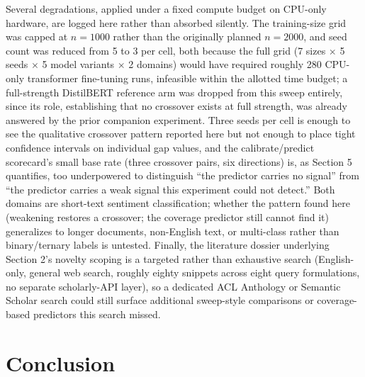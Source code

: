 \documentclass[11pt,letterpaper]{article}
\begin{document}
Several degradations, applied under a fixed compute budget on CPU-only hardware, are logged here rather than absorbed silently. The training-size grid was capped at $n{=}1000$ rather than the originally planned $n{=}2000$, and seed count was reduced from 5 to 3 per cell, both because the full grid (7 sizes $\times$ 5 seeds $\times$ 5 model variants $\times$ 2 domains) would have required roughly 280 CPU-only transformer fine-tuning runs, infeasible within the allotted time budget; a full-strength DistilBERT reference arm was dropped from this sweep entirely, since its role, establishing that no crossover exists at full strength, was already answered by the prior companion experiment. Three seeds per cell is enough to see the qualitative crossover pattern reported here but not enough to place tight confidence intervals on individual gap values, and the calibrate/predict scorecard's small base rate (three crossover pairs, six directions) is, as Section 5 quantifies, too underpowered to distinguish ``the predictor carries no signal'' from ``the predictor carries a weak signal this experiment could not detect.'' Both domains are short-text sentiment classification; whether the pattern found here (weakening restores a crossover; the coverage predictor still cannot find it) generalizes to longer documents, non-English text, or multi-class rather than binary/ternary labels is untested. Finally, the literature dossier underlying Section 2's novelty scoping is a targeted rather than exhaustive search (English-only, general web search, roughly eighty snippets across eight query formulations, no separate scholarly-API layer), so a dedicated ACL Anthology or Semantic Scholar search could still surface additional sweep-style comparisons or coverage-based predictors this search missed.

\section{Conclusion}
\end{document}
